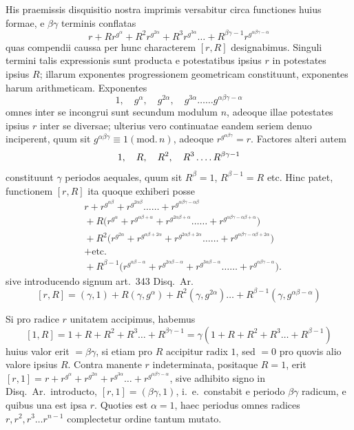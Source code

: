 His praemissis disquisitio nostra imprimis versabitur circa functiones huius formae, e $\beta\gamma$ terminis conflatas
\[
r+Rr^{g^\alpha}+R^2r^{g^{2\alpha}}+R^3r^{g^{3\alpha}}\ldots+R^{\beta\gamma-1}r^{g^{\alpha\beta\gamma-\alpha}}
\]
quas compendii caussa per hunc characterem $[r,R]$ designabimus. Singuli termini talis expressionis sunt producta e potestatibus ipsius $r$ in potestates ipsius $R$; illarum exponentes progressionem geometricam constituunt, exponentes harum arithmeticam. Exponentes
\[
1,\quad g^\alpha,\quad g^{2\alpha},\quad g^{3\alpha}\ldots\ldots g^{\alpha\beta\gamma-\alpha}
\]
omnes inter se incongrui sunt secundum modulum $n$, adeoque illae potestates ipsius $r$ inter se diversae; ulterius vero continuatae eandem seriem denuo inciperent, quum sit $g^{\alpha\beta\gamma}\equiv1(\mathrm{mod.}\,n)$, adeoque $r^{g^{\alpha\beta\gamma}}=r$. Factores alteri autem
\[
1,\quad R,\quad R^2,\quad R^3\mathinner{.\,.\,.\,.} R^{\beta\gamma-1}
\]
constituunt $\gamma$ periodos aequales, quum sit $R^\beta=1$, $R^{\beta-1}=R$ etc. Hinc patet, functionem $[r,R]$ ita quoque exhiberi posse
\[
\begin{aligned}
&r+r^{g^{\alpha\beta}}+r^{g^{2\alpha\beta}}\ldots\ldots+r^{g^{\alpha\beta\gamma-\alpha\beta}}\\
&{}+R\bigl(r^{g^\alpha}+r^{g^{\alpha\beta+\alpha}}+r^{g^{2\alpha\beta+\alpha}}\ldots\ldots+r^{g^{\alpha\beta\gamma-\alpha\beta+\alpha}}\bigr)\\
&{}+R^2\bigl(r^{g^{2\alpha}}+r^{g^{\alpha\beta+2\alpha}}+r^{g^{2\alpha\beta+2\alpha}}\ldots\ldots+r^{g^{\alpha\beta\gamma-\alpha\beta+2\alpha}}\bigr)\\
&{}+\text{etc.}\\
&{}+R^{\beta-1}\bigl(r^{g^{\alpha\beta-\alpha}}+r^{g^{2\alpha\beta-\alpha}}+r^{g^{3\alpha\beta-\alpha}}\ldots\ldots+r^{g^{\alpha\beta\gamma-\alpha}}\bigr).
\end{aligned}
\]
sive introducendo signum art.\ 343 Disq.\ Ar.
\[
[r,R]=(\gamma,1)+R(\gamma,g^\alpha)+R^2(\gamma,g^{2\alpha})\ldots+R^{\beta-1}(\gamma,g^{\alpha\beta-\alpha})
\]

%
Si pro radice $r$ unitatem accipimus, habemus
\[
[1,R]=1+R+R^2+R^3\ldots+R^{\beta\gamma-1}=\gamma(1+R+R^2+R^3\ldots+R^{\beta-1})
\]
huius valor erit $=\beta\gamma$, si etiam pro $R$ accipitur radix $1$, sed $=0$ pro quovis alio valore ipsius $R$. Contra manente $r$ indeterminata, positaque $R=1$, erit $[r,1]=r+r^{g^\alpha}+r^{g^{2\alpha}}+r^{g^{3\alpha}}\ldots+r^{g^{\alpha\beta\gamma-\alpha}}$, sive adhibito signo in Disq.\ Ar.\ introducto, $[r,1]=(\beta\gamma,1)$, i.\ e.\ constabit e periodo $\beta\gamma$ radicum, e quibus una est ipsa $r$. Quoties est $\alpha=1$, haec periodus omnes radices $r,r^2,r^3\ldots r^{n-1}$ complectetur ordine tantum mutato.

